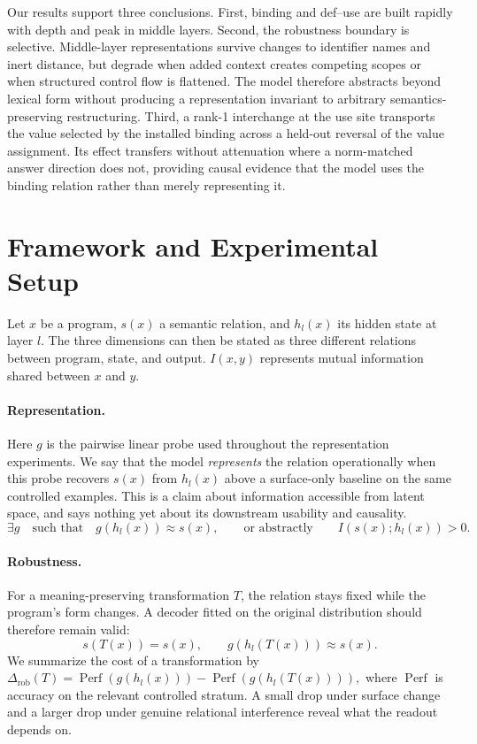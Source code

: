 \documentclass{article}
\begin{document}
Our results support three conclusions. First, binding and def--use are built rapidly with depth and peak in middle layers. Second, the robustness boundary is selective. Middle-layer representations survive changes to identifier names and inert distance, but degrade when added context creates competing scopes or when structured control flow is flattened. The model therefore abstracts beyond lexical form without producing a representation invariant to arbitrary semantics-preserving restructuring. Third, a rank-1 interchange at the use site transports the value selected by the installed binding across a held-out reversal of the value assignment. Its effect transfers without attenuation where a norm-matched answer direction does not, providing causal evidence that the model uses the binding relation rather than merely representing it.

\section{Framework and Experimental Setup}
\label{sec:setup}

Let $x$ be a program, $s(x)$ a semantic relation, and $h_l(x)$ its hidden state at layer $l$. The three dimensions can then be stated as three different relations between program, state, and output. $I(x, y)$ represents mutual information shared between $x$ and $y$. 

\paragraph{Representation.}
Here $g$ is the pairwise linear probe used throughout the representation experiments. We say that the model \emph{represents} the relation operationally when this probe recovers $s(x)$ from $h_l(x)$ above a surface-only baseline on the same controlled examples. This is a claim about information accessible from latent space, and says nothing yet about its downstream usability and causality. 
\begin{equation}
  \exists g \quad \text{such that} \quad g(h_l(x)) \approx s(x),
  \qquad\text{or abstractly}\qquad
  I\!\left(s(x);h_l(x)\right)>0.
  \label{eq:representation}
\end{equation}

\paragraph{Robustness.}
For a meaning-preserving transformation $T$, the relation stays fixed while the program's form changes. A decoder fitted on the original distribution should therefore remain valid:
\begin{equation}
  s(T(x))=s(x),
  \qquad
  g(h_l(T(x)))\approx s(x).
  \label{eq:robustness}
\end{equation}
We summarize the cost of a transformation by $  \Delta_{\mathrm{rob}}(T)
  =\operatorname{Perf}\!\left(g(h_l(x))\right)
  -\operatorname{Perf}\!\left(g(h_l(T(x)))\right),
  \label{eq:robustness-drop}
$ where \(\operatorname{Perf}\) is accuracy on the relevant controlled stratum. A small drop under surface change and a larger drop under genuine relational interference reveal what the readout depends on.
\end{document}
